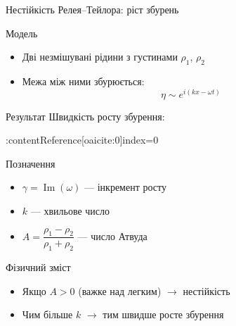 \documentclass[]{beamer}
\begin{document}
\begin{frame}{Нестійкість Релея--Тейлора: ріст збурень}{}
	\begin{block}{Модель}
		\begin{itemize}
			\item Дві незмішувані рідини з густинами $\rho_1$, $\rho_2$
			\item Межа між ними збурюється:
			      \[
				      \eta \sim e^{i(kx - \omega t)}
			      \]
		\end{itemize}
	\end{block}

	\begin{block}{Результат}
		Швидкість росту збурення:
	\end{block}

	\begin{center}
		:contentReference[oaicite:0]{index=0}
	\end{center}

	\begin{block}{Позначення}
		\begin{itemize}
			\item $\gamma = \operatorname{Im}(\omega)$ --- інкремент росту
			\item $k$ --- хвильове число
			\item $A = \dfrac{\rho_1 - \rho_2}{\rho_1 + \rho_2}$ --- число Атвуда
		\end{itemize}
	\end{block}

	\begin{block}{Фізичний зміст}
		\begin{itemize}
			\item Якщо $A > 0$ (важке над легким) $\rightarrow$ нестійкість
			\item Чим більше $k$ $\rightarrow$ тим швидше росте збурення
		\end{itemize}
	\end{block}
\end{frame}
\end{document}

